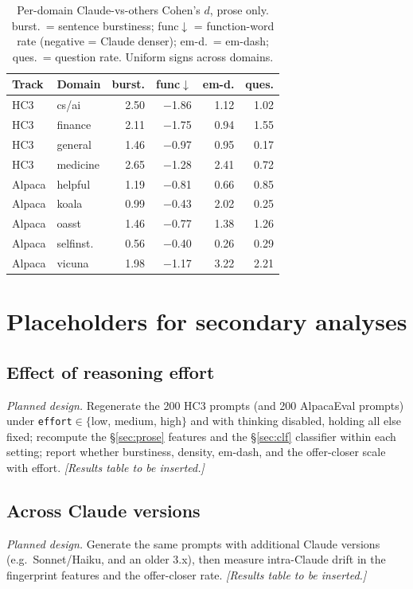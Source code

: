 \documentclass[11pt]{article}
\begin{document}
\begin{table}[t]
\centering\small
\setlength{\tabcolsep}{4pt}
\begin{tabular}{@{}llrrrr@{}}
\toprule
Track & Domain & burst. & func$\downarrow$ & em-d. & ques. \\
\midrule
HC3 & cs/ai & 2.50 & $-$1.86 & 1.12 & 1.02 \\
HC3 & finance & 2.11 & $-$1.75 & 0.94 & 1.55 \\
HC3 & general & 1.46 & $-$0.97 & 0.95 & 0.17 \\
HC3 & medicine & 2.65 & $-$1.28 & 2.41 & 0.72 \\
Alpaca & helpful & 1.19 & $-$0.81 & 0.66 & 0.85 \\
Alpaca & koala & 0.99 & $-$0.43 & 2.02 & 0.25 \\
Alpaca & oasst & 1.46 & $-$0.77 & 1.38 & 1.26 \\
Alpaca & selfinst. & 0.56 & $-$0.40 & 0.26 & 0.29 \\
Alpaca & vicuna & 1.98 & $-$1.17 & 3.22 & 2.21 \\
\bottomrule
\end{tabular}
\caption{Per-domain Claude-vs-others Cohen's $d$, prose only. burst.\ = sentence
burstiness; func$\downarrow$ = function-word rate (negative = Claude denser);
em-d.\ = em-dash; ques.\ = question rate. Uniform signs across domains.}
\label{tab:domain}
\end{table}

\section{Placeholders for secondary analyses}
\label{app:placeholders}

\subsection{Effect of reasoning effort}
\label{app:effort}
\emph{Planned design.} Regenerate the 200 HC3 prompts (and 200 AlpacaEval
prompts) under \texttt{effort}$\in\{$low, medium, high$\}$ and with thinking
disabled, holding all else fixed; recompute the \S\ref{sec:prose} features and
the \S\ref{sec:clf} classifier within each setting; report whether burstiness,
density, em-dash, and the offer-closer scale with effort.
\emph{[Results table to be inserted.]}

\subsection{Across Claude versions}
\label{app:versions}
\emph{Planned design.} Generate the same prompts with additional Claude versions
(e.g.\ Sonnet/Haiku, and an older 3.x), then measure intra-Claude drift in the
fingerprint features and the offer-closer rate.
\emph{[Results table to be inserted.]}
\end{document}
